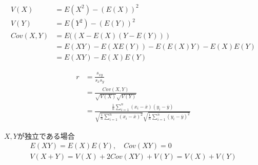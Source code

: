 \documentclass[12pt,b5paper]{ltjsarticle}
\begin{document}
\hrulefill

\begin{align}
 V(X) &= E(X^{2})-(E(X))^{2}\\
 V(Y) &= E(Y^{2})-(E(Y))^{2}\\
 Cov(X,Y) &= E( (X-E(X)(Y-E(Y)) )\\
 &= E(XY)-E(XE(Y))-E(E(X)Y)-E(X)E(Y)\\
 &= E(XY)-E(X)E(Y)
\end{align}


\begin{align}
 r &= \frac{s_{xy}}{s_xs_y} \\
 &= \frac{Cov(X,Y)}{\sqrt{V(X)}\sqrt{V(Y)}}\\
 &=
 \frac{\frac{1}{n}\sum_{i=1}^n(x_i-\overline{x})(y_i-\overline{y})}
 {\sqrt{\frac{1}{n}\sum_{i=1}^n(x_i-\overline{x})^2}
 \sqrt{\frac{1}{n}\sum_{i=1}^n(y_i-\overline{y})^2}}
\end{align}


$X,Y$が独立である場合
\begin{gather}
 E(XY)=E(X)E(Y),\quad Cov(XY)=0\\
 V(X+Y)=V(X)+2Cov(XY)+V(Y)=V(X)+V(Y)
\end{gather}


\hrulefill
\end{document}
